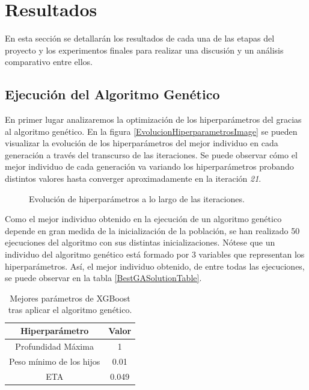 
\chapter{Resultados}
\label{resultados}

  En esta sección se detallarán los resultados de cada una de las etapas del proyecto y los experimentos finales para realizar una discusión y un análisis comparativo entre ellos.

\section{Ejecución del Algoritmo Genético}

  En primer lugar analizaremos la optimización de los hiperparámetros del  gracias al algoritmo genético. En la figura \eqref{EvolucionHiperparametrosImage} se pueden visualizar la evolución de los hiperparámetros del mejor individuo en cada generación a través del transcurso de las iteraciones. Se puede observar cómo el mejor individuo de cada generación va variando los hiperparámetros probando distintos valores hasta converger aproximadamente en la iteración \textit{21}.

  \begin{figure}[H]
      \centering
      
      \caption{Evolución de hiperparámetros a lo largo de las iteraciones.}
      \label{EvolucionHiperparametrosImage}
   \end{figure}

  Como el mejor individuo obtenido en la ejecución de un algoritmo genético depende en gran medida de la inicialización de la población, se han realizado 50 ejecuciones del algoritmo con sus distintas inicializaciones. Nótese que un individuo del algoritmo genético está formado por 3 variables que representan los hiperparámetros. Así, el mejor individuo obtenido, de entre todas las ejecuciones, se puede observar en la tabla \eqref{BestGASolutionTable}.

  \begin{table}[H]
      \small
      \centering
          \begin{tabular}{ |c|c| } 
              \hline
              \textbf{Hiperparámetro} & \textbf{Valor}\\
              \hline
                  Profundidad Máxima & 1 \\
                  Peso mínimo de los hijos & 0.01 \\ 
                  ETA & 0.049 \\ 
              \hline

          \end{tabular}
      \caption{Mejores parámetros de XGBoost tras aplicar el algoritmo genético.}
      \label{BestGASolutionTable}
  \end{table}

